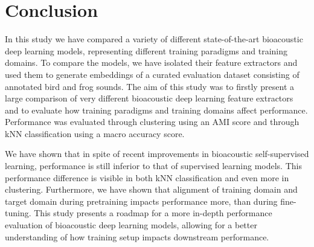 \section{Conclusion}
\label{sec:conslusion}

In this study we have compared a variety of different state-of-the-art bioacoustic deep learning models, representing different training paradigms and training domains.
To compare the models, we have isolated their feature extractors and used them to generate embeddings of a curated evaluation dataset consisting of annotated bird and frog sounds.
The aim of this study was to firstly present a large comparison of very different bioacoustic deep learning feature extractors and to evaluate how training paradigms and training domains affect performance.
Performance was evaluated through clustering using an AMI score and through kNN classification using a macro accuracy score.

We have shown that in spite of recent improvements in bioacoustic self-supervised learning, performance is still inferior to that of supervised learning models.
This performance difference is visible in both kNN classification and even more in clustering.
Furthermore, we have shown that alignment of training domain and target domain during pretraining impacts performance more, than during fine-tuning.
This study presents a roadmap for a more in-depth performance evaluation of bioacoustic deep learning models, allowing for a better understanding of how training setup impacts downstream performance.